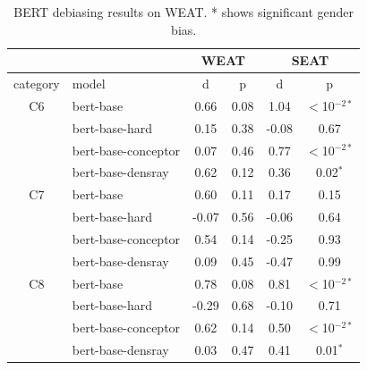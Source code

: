 \begin{table}[h]
\centering
\footnotesize
\begin{tabular}{clcccc}
\hline
&&\multicolumn{2}{c}{WEAT}&\multicolumn{2}{c}{SEAT}\\
\hline
category & model & d & p& d & p\\
\hline
C6 & bert-base & 0.66 & 0.08 &1.04&$<$10$^{-2*}$\\
& bert-base-hard & 0.15 & 0.38&-0.08&0.67\\
& bert-base-conceptor & 0.07 & 0.46&0.77&$<$10$^{-2*}$\\
&bert-base-densray & 0.62 & 0.12&0.36&0.02$^{*}$\\
\hline
C7 & bert-base & 0.60 & 0.11 &0.17&0.15\\
& bert-base-hard & -0.07 & 0.56&-0.06&0.64\\
& bert-base-conceptor & 0.54 & 0.14&-0.25&0.93\\
& bert-base-densray & 0.09 & 0.45&-0.47&0.99\\
\hline
C8& bert-base & 0.78 & 0.08 &0.81&$<$10$^{-2*}$\\
& bert-base-hard & -0.29 & 0.68&-0.10&0.71\\
& bert-base-conceptor & 0.62 & 0.14&0.50&$<$10$^{-2*}$\\
& bert-base-densray & 0.03 & 0.47&0.41&0.01$^{*}$\\

\hline
\end{tabular}
\caption{
BERT debiasing results on WEAT. * shows significant gender bias.}
\end{table}

